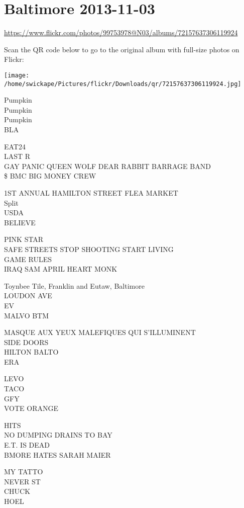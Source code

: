 \documentclass[10pt,letterpaper]{article}
\begin{document}
\section*{Baltimore 2013-11-03}

\url{https://www.flickr.com/photos/99753978@N03/albums/72157637306119924}

Scan the QR code below to go to the original album with full-size photos on Flickr:

\texttt{[image: /home/swickape/Pictures/flickr/Downloads/qr/72157637306119924.jpg]}


Pumpkin\\
Pumpkin\\
Pumpkin\\
BLA

EAT24\\
LAST R\\
GAY PANIC QUEEN WOLF DEAR RABBIT BARRAGE BAND\\
\$ BMC BIG MONEY CREW

1ST ANNUAL HAMILTON STREET FLEA MARKET\\
Split\\
USDA\\
BELIEVE

PINK STAR\\
SAFE STREETS STOP SHOOTING START LIVING\\
GAME RULES\\
IRAQ SAM APRIL HEART MONK

Toynbee Tile, Franklin and Eutaw, Baltimore\\
LOUDON AVE\\
EV\\
MALVO BTM

MASQUE AUX YEUX MALEFIQUES QUI S'ILLUMINENT\\
SIDE DOORS\\
HILTON BALTO\\
ERA

LEVO\\
TACO\\
GFY\\
VOTE ORANGE

HITS\\
NO DUMPING DRAINS TO BAY\\
E.T. IS DEAD\\
BMORE HATES SARAH MAIER

MY TATTO\\
NEVER ST\\
CHUCK\\
HOEL
\end{document}

